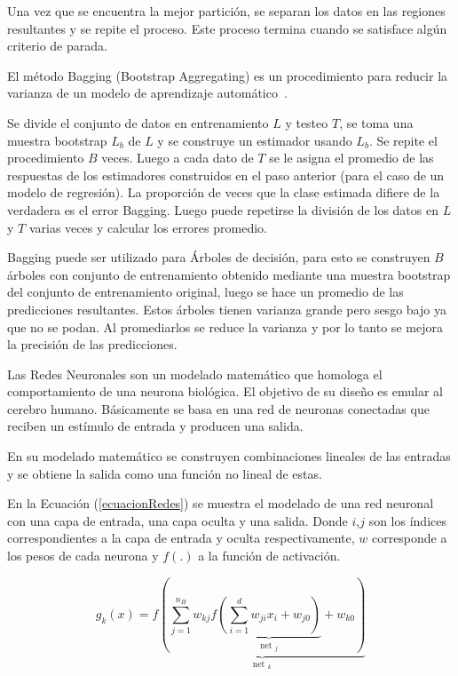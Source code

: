 \documentclass[a4paper,12pt,twocolumn]{article}
\begin{document}
Una vez que se encuentra la mejor partición, se separan los datos en las regiones resultantes y se repite el proceso. Este proceso termina cuando se satisface algún criterio de parada.

El método Bagging (Bootstrap Aggregating) es un procedimiento para reducir la varianza de un modelo de aprendizaje automático~\cite{libroCurso}.

Se divide el conjunto de datos en entrenamiento $L$ y testeo $T$, se toma una muestra bootstrap $L_b$ de $L$ y se construye un estimador usando $L_b$. Se repite el procedimiento $B$ veces. Luego a cada dato de $T$ se le asigna el promedio de las respuestas de los estimadores construidos en el paso anterior (para el caso de un modelo de regresión). La proporción de veces que la clase estimada difiere de la verdadera es el error Bagging. Luego puede repetirse la división de los datos en $L$ y $T$ varias veces y calcular los errores promedio.

Bagging puede ser utilizado para Árboles de decisión, para esto se construyen $B$ árboles con conjunto de entrenamiento obtenido mediante una muestra bootstrap del conjunto de entrenamiento original, luego se hace un promedio de las predicciones resultantes. Estos árboles tienen varianza grande pero sesgo bajo ya que no se podan. Al promediarlos se reduce la varianza y por lo tanto se mejora la precisión de las predicciones.

Las Redes Neuronales son un modelado matemático que homologa el comportamiento de una neurona biológica. El objetivo de su diseño es emular al cerebro humano. Básicamente   se basa en una red  de neuronas conectadas que reciben un estímulo de entrada y producen una salida.   

En su modelado matemático se construyen combinaciones lineales de las entradas y se obtiene la salida como una función no lineal de estas. 

En la Ecuación (\ref{ecuacionRedes}) se muestra el modelado de una red neuronal con una capa de entrada, una capa oculta  y una salida. Donde $i$,$j$ son los índices correspondientes a la capa de entrada y oculta respectivamente, $w$ corresponde a los pesos de cada neurona y $f(.)$ a la función de activación.

\begin{equation}
g_{k}(x)=f \underbrace{(\sum_{j=1}^{n_{H}} w_{k j} f \underbrace{\left(\sum_{i=1}^{d} w_{j i} x_{i}+w_{j 0}\right)}_{\text {net }_{j}}+w_{k 0})}_{\text {net }_{k}}
\label{ecuacionRedes}
\end{equation}
\end{document}
